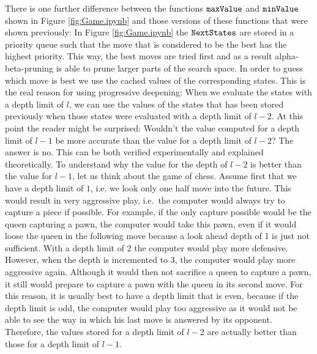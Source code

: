 There is one further difference between the functions $\texttt{maxValue}$ and $\texttt{minValue}$ shown in
Figure \ref{fig:Game.ipynb} and those versions of these functions that were shown previously:
In Figure \ref{fig:Game.ipynb} the $\texttt{NextStates}$ are stored in a priority queue such that the move that
is considered to be the best has the highest priority.  This way, the best moves are tried first and as a
result alpha-beta-pruning is able to prune larger parts of the search space.
In order to guess which move is best we use the cached values of the corresponding states.  This is the real
reason for using progressive deepening:  When we evaluate the states with a depth limit of $l$, we can use the
values of the states that has been stored previously when those states were evaluated with a depth limit of
$l-2$.  At this point the reader might be surprised: Wouldn't the value computed for a depth limit of $l-1$ be
more accurate than the value for a depth limit of $l-2$?  The answer is no.  This can be both verified
experimentally and explained theoretically.  To understand why the value for the depth of $l-2$ is better than
the value for $l-1$, let us think about the game of chess.  Assume first that we have a depth limit of $1$,
i.e. we look only one half move into the future.  This would result in very aggressive play, i.e.~the computer
would always try to capture a piece if possible.  For example, if the only capture possible would be the queen
capturing a  pawn, the computer would take this pawn, even if it would loose the queen in the following move
because a look ahead depth of 1 is just not sufficient.  With a depth limit of $2$ the computer would play more
defensive. However, when the depth is incremented to 3, the computer would play more aggressive again.
Although it would then not sacrifice a queen to capture a pawn, it still would prepare to capture a pawn with
the queen in its second move.  For this reason, it is usually best to have a depth limit that is even, because
if the depth limit is odd, the computer would play too aggressive as it would not be able to see the way in
which his last move is answered by its opponent.  Therefore, the values stored for a depth limit of $l-2$ are
actually better than those for a depth limit of $l-1$. 


